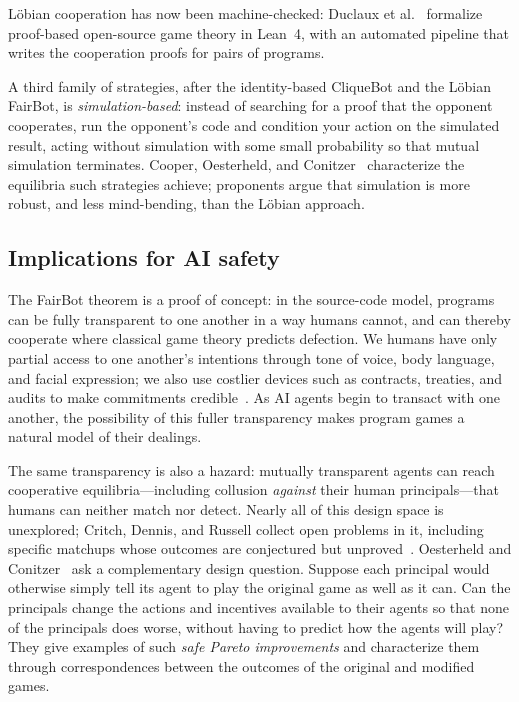 L\"obian cooperation has now been machine-checked: Duclaux et al.~\cite{duclaux2026} formalize proof-based open-source game theory in Lean~4, with an automated pipeline that writes the cooperation proofs for pairs of programs.

A third family of strategies, after the identity-based CliqueBot and the L\"obian FairBot, is \emph{simulation-based}: instead of searching for a proof that the opponent cooperates, run the opponent's code and condition your action on the simulated result, acting without simulation with some small probability so that mutual simulation terminates. Cooper, Oesterheld, and Conitzer~\cite{cooper2025} characterize the equilibria such strategies achieve; proponents argue that simulation is more robust, and less mind-bending, than the L\"obian approach.

\subsection{Implications for AI safety}

The FairBot theorem is a proof of concept: in the source-code model, programs can be fully transparent to one another in a way humans cannot, and can thereby cooperate where classical game theory predicts defection. We humans have only partial access to one another's intentions through tone of voice, body language, and facial expression; we also use costlier devices such as contracts, treaties, and audits to make commitments credible~\cite{schelling1960}. As AI agents begin to transact with one another, the possibility of this fuller transparency makes program games a natural model of their dealings.

The same transparency is also a hazard: mutually transparent agents can reach cooperative equilibria---including collusion \emph{against} their human principals---that humans can neither match nor detect. Nearly all of this design space is unexplored; Critch, Dennis, and Russell collect open problems in it, including specific matchups whose outcomes are conjectured but unproved~\cite{critch2022}. Oesterheld and Conitzer~\cite{oesterheld2021} ask a complementary design question. Suppose each principal would otherwise simply tell its agent to play the original game as well as it can. Can the principals change the actions and incentives available to their agents so that none of the principals does worse, without having to predict how the agents will play? They give examples of such \emph{safe Pareto improvements} and characterize them through correspondences between the outcomes of the original and modified games.

